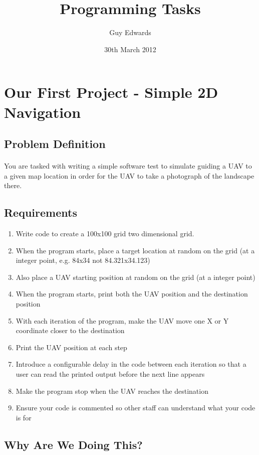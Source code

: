 \documentclass[11pt]{book}
\title{\textbf{Programming Tasks}}
\author{Guy Edwards}
\date{30th March 2012}
\begin{document}
\section{Our First Project - Simple 2D Navigation}

\subsection{Problem Definition}

\paragraph{} You are tasked with writing a simple software test to simulate guiding a UAV to a given map location in order for the UAV to take a photograph of the landscape there. 

\subsection{Requirements}

\begin{enumerate}
\item Write code to create a 100x100 grid two dimensional grid.
\item When the program starts, place a target location at random on the grid (at a integer point, e.g. 84x34 not 84.321x34.123)
\item Also place a UAV starting position at random on the grid (at a integer point)
\item When the program starts, print both the UAV position and the destination position
\item With each iteration of the program, make the UAV move one X or Y coordinate closer to the destination
\item Print the UAV position at each step
\item Introduce a configurable delay in the code between each iteration so that a user can read the printed output before the next line appears
\item Make the program stop when the UAV reaches the destination
\item Ensure your code is commented so other staff can understand what your code is for
\end{enumerate}

\subsection{Why Are We Doing This?}
\end{document}
